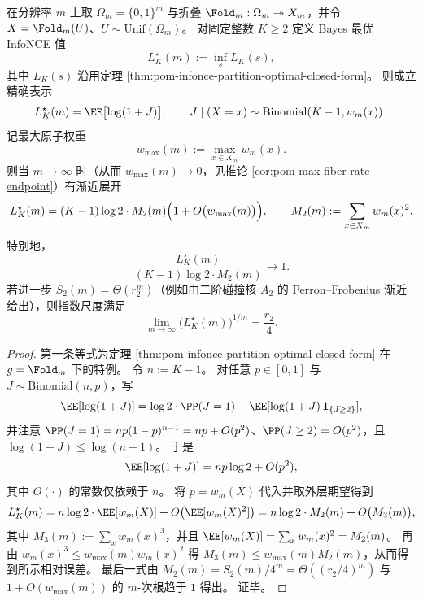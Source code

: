 \begin{theorem}\label{thm:pom-bayes-infonce-second-collision-dominance}
在分辨率 \(m\) 上取 \(\Omega_m=\{0,1\}^m\) 与折叠 \(\Fold_m:\Omega_m\twoheadrightarrow X_m\)，并令 \(X=\Fold_m(U)\)、\(U\sim\mathrm{Unif}(\Omega_m)\)。
对固定整数 \(K\ge 2\) 定义 Bayes 最优 InfoNCE 值
\[
L_K^\star(m):=\inf_s L_K(s),
\]
其中 \(L_K(s)\) 沿用定理 \ref{thm:pom-infonce-partition-optimal-closed-form}。
则成立精确表示
\[
L_K^\star(m)=\EE\bigl[\log(1+J)\bigr],\qquad
J\mid(X=x)\sim \mathrm{Binomial}\!\left(K-1,w_m(x)\right).
\]
记最大原子权重
\[
w_{\max}(m):=\max_{x\in X_m} w_m(x).
\]
则当 \(m\to\infty\) 时（从而 \(w_{\max}(m)\to 0\)，见推论 \ref{cor:pom-max-fiber-rate-endpoint}）有渐近展开
\[
L_K^\star(m)
=(K-1)\log 2\cdot M_2(m)\Bigl(1+O\bigl(w_{\max}(m)\bigr)\Bigr),
\qquad
M_2(m):=\sum_{x\in X_m}w_m(x)^2.
\]
特别地，
\[
\frac{L_K^\star(m)}{(K-1)\log 2\cdot M_2(m)}\longrightarrow 1.
\]
若进一步 \(S_2(m)=\Theta(r_2^m)\)（例如由二阶碰撞核 \(A_2\) 的 Perron--Frobenius 渐近给出），则指数尺度满足
\[
\lim_{m\to\infty}\bigl(L_K^\star(m)\bigr)^{1/m}=\frac{r_2}{4}.
\]
\end{theorem}
\begin{proof}
第一条等式为定理 \ref{thm:pom-infonce-partition-optimal-closed-form} 在 \(g=\Fold_m\) 下的特例。
令 \(n:=K-1\)。
对任意 \(p\in[0,1]\) 与 \(J\sim\mathrm{Binomial}(n,p)\)，写
\[
\EE[\log(1+J)]
=\log 2\cdot\PP(J=1)+\EE[\log(1+J)\,\mathbf 1_{\{J\ge 2\}}],
\]
并注意 \(\PP(J=1)=np(1-p)^{n-1}=np+O(p^2)\)、\(\PP(J\ge 2)=O(p^2)\)，且 \(\log(1+J)\le \log(n+1)\)。
于是
\[
\EE[\log(1+J)]=np\log 2+O(p^2),
\]
其中 \(O(\cdot)\) 的常数仅依赖于 \(n\)。
将 \(p=w_m(X)\) 代入并取外层期望得到
\[
L_K^\star(m)
=n\log 2\cdot \EE[w_m(X)]+O\!\left(\EE[w_m(X)^2]\right)
=n\log 2\cdot M_2(m)+O\bigl(M_3(m)\bigr),
\]
其中 \(M_3(m):=\sum_x w_m(x)^3\)，并且 \(\EE[w_m(X)]=\sum_x w_m(x)^2=M_2(m)\)。
再由 \(w_m(x)^3\le w_{\max}(m)w_m(x)^2\) 得 \(M_3(m)\le w_{\max}(m)M_2(m)\)，从而得到所示相对误差。
最后一式由 \(M_2(m)=S_2(m)/4^m=\Theta((r_2/4)^m)\) 与 \(1+O(w_{\max}(m))\) 的 \(m\)-次根趋于 \(1\) 得出。
证毕。
\end{proof}

\endinput

